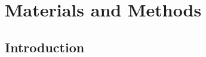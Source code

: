 \section{Materials and Methods}
\vspace{-3em}
\subsection{Introduction}
\vspace{-2em}
\hspace{\parindent} \blindtext

